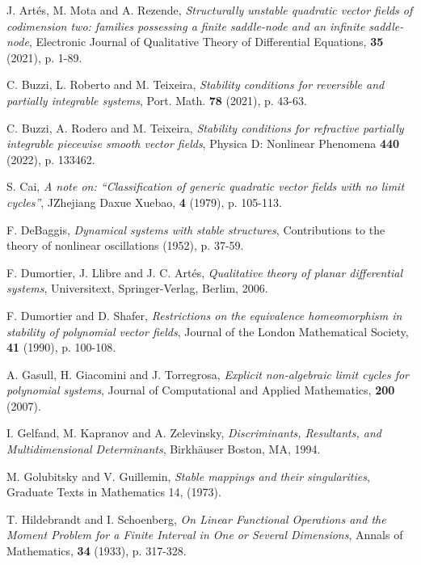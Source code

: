 \documentclass[11pt]{amsart}
\begin{document}
\begin{thebibliography}{99}
{\sc J. Artés, M. Mota and A. Rezende}, 
{\it Structurally unstable quadratic vector fields of codimension two: families possessing a finite	saddle-node and an infinite saddle-node},
Electronic Journal of Qualitative Theory of Differential Equations, \textbf{35} (2021), p. 1-89.	

{\sc C. Buzzi, L. Roberto and M. Teixeira}, 
{\it Stability conditions for reversible and partially integrable systems},
Port. Math. \textbf{78} (2021), p. 43-63.

{\sc C. Buzzi, A. Rodero and M. Teixeira}, 
{\it Stability conditions for refractive partially integrable piecewise smooth vector fields},
Physica D: Nonlinear Phenomena \textbf{440} (2022), p. 133462.

{\sc S. Cai}, 
{\it A note on: ``Classification of generic quadratic vector fields with no limit cycles''},
JZhejiang Daxue Xuebao, \textbf{4} (1979), p. 105-113.

{\sc F. DeBaggis}, 
{\it Dynamical systems with stable structures},
Contributions to the theory of nonlinear oscillations (1952), p. 37-59.

{\sc F. Dumortier, J. Llibre and J. C. Art\'es}, 
{\it Qualitative theory of planar differential systems},
Universitext, Springer-Verlag, Berlim, 2006.
	
{\sc F. Dumortier and D. Shafer}, 
{\it Restrictions on the equivalence homeomorphism in stability of polynomial vector fields},
Journal of the London Mathematical Society, \textbf{41} (1990), p. 100-108.

{\sc A. Gasull, H. Giacomini and J. Torregrosa}, 
{\it Explicit non-algebraic limit cycles for polynomial systems},
Journal of Computational and Applied Mathematics, \textbf{200} (2007).

{\sc I. Gelfand, M. Kapranov and A. Zelevinsky}, 
{\it Discriminants, Resultants, and Multidimensional Determinants},
Birkhäuser Boston, MA, 1994.

{\sc M. Golubitsky and V. Guillemin}, 
{\it Stable mappings and their singularities},
Graduate Texts in Mathematics 14, (1973).

{\sc T. Hildebrandt and I. Schoenberg}, 
{\it On Linear Functional Operations and the Moment Problem for a Finite Interval in One or Several Dimensions},
Annals of Mathematics, \textbf{34} (1933), p. 317-328.


\end{thebibliography}
\end{document}
